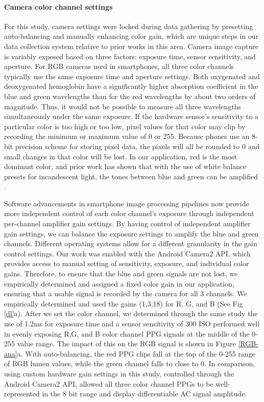 \documentclass[12pt]{article}
\begin{document}
\paragraph*{Camera color channel settings}
For this study, camera settings were locked during data gathering by presetting auto-balancing and manually enhancing color gain, which are unique steps in our data collection system relative to prior works in this area.
Camera image capture is variably exposed based on three factors: exposure time, sensor sensitivity, and aperture. For RGB cameras used in smartphones, all three color channels typically use the same exposure time and aperture settings. Both oxygenated and deoxygenated hemoglobin have a significantly higher absorption coefficient in the blue and green wavelengths than for the red wavelengths by about two orders of magnitude. Thus, it would not be possible to measure all three wavelengths simultaneously under the same exposure. If the hardware sensor's sensitivity to a particular color is too high or too low, pixel values for that color may clip by recording the minimum or maximum value of 0 or 255. Because phones use an 8-bit precision scheme for storing pixel data, the pixels will all be rounded to 0 and small changes in that color will be lost. In our application, red is the most dominant color, and prior work has shown that with the use of white balance presets for incandescent light, the tones between blue and green can be amplified \cite{karlen2013detection}. 
	
Software advancements in smartphone image processing pipelines now provide more independent control of each color channel's exposure through independent per-channel amplifier gain settings. By having control of independent amplifier gain settings, we can balance the exposure settings to amplify the blue and green channels. Different operating systems allow for a different granularity in the gain control settings. Our work was enabled with the Android Camera2 API, which provides access to manual setting of sensitivity, exposure, and individual color gains. Therefore, to ensure that the blue and green signals are not lost, we empirically determined and assigned a fixed color gain in our application, ensuring that a usable signal is recorded by the camera for all 3 channels. We empirically determined and used the gains (1,3,18) for R, G, and B (See Fig \ref{dl}a). After we set the color channel, we determined through the same study the use of 1.2ms for exposure time and a sensor sensitivity of 300 ISO performed well in evenly exposing R,G, and B color channel PPG signals at the middle of the 0-255 value range. The impact of this on the RGB signal is shown in Figure \ref{RGB-ana}a.
With auto-balancing, the red PPG clips fall at the top of the 0-255 range of RGB lumen values, while the green channel falls to close to 0. In comparison, using custom hardware gain settings in this study, controlled through the Android Camera2 API, allowed all three color channel PPGs to be well-represented in the 8 bit range and display differentiable AC signal amplitude. 
\end{document}
